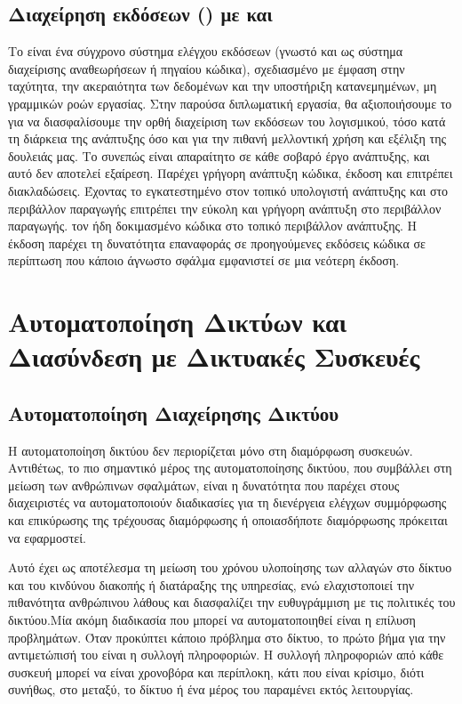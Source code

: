 \subsection{Διαχείρηση εκδόσεων () με  και  }

Το  είναι ένα σύγχρονο σύστημα ελέγχου εκδόσεων (γνωστό και ως σύστημα διαχείρισης αναθεωρήσεων ή πηγαίου κώδικα), 
σχεδιασμένο με έμφαση στην ταχύτητα, την ακεραιότητα των δεδομένων και την υποστήριξη κατανεμημένων, μη γραμμικών ροών εργασίας. 
Στην παρούσα διπλωματική εργασία, θα αξιοποιήσουμε το  για να διασφαλίσουμε την ορθή διαχείριση των εκδόσεων του λογισμικού, 
τόσο κατά τη διάρκεια της ανάπτυξης όσο και για την πιθανή μελλοντική χρήση και εξέλιξη της δουλειάς μας. Το  συνεπώς είναι απαραίτητο σε κάθε σοβαρό 
έργο ανάπτυξης, και αυτό δεν αποτελεί εξαίρεση. Παρέχει γρήγορη ανάπτυξη κώδικα, έκδοση και επιτρέπει διακλαδώσεις. Έχοντας το εγκατεστημένο στον 
τοπικό υπολογιστή ανάπτυξης και στο περιβάλλον παραγωγής επιτρέπει την εύκολη και γρήγορη ανάπτυξη στο περιβάλλον παραγωγής.
τον ήδη δοκιμασμένο κώδικα στο τοπικό περιβάλλον ανάπτυξης. Η έκδοση παρέχει τη δυνατότητα επαναφοράς σε προηγούμενες εκδόσεις κώδικα σε
περίπτωση που κάποιο άγνωστο σφάλμα εμφανιστεί σε μια νεότερη έκδοση. 

\section{Αυτοματοποίηση Δικτύων και Διασύνδεση με Δικτυακές Συσκευές}

\subsection{Αυτοματοποίηση Διαχείρησης Δικτύου}

Η αυτοματοποίηση δικτύου δεν περιορίζεται μόνο στη διαμόρφωση συσκευών. 
Αντιθέτως, το πιο σημαντικό μέρος της αυτοματοποίησης δικτύου, που συμβάλλει στη μείωση των ανθρώπινων σφαλμάτων, 
είναι η δυνατότητα που παρέχει στους διαχειριστές να αυτοματοποιούν διαδικασίες για τη διενέργεια ελέγχων συμμόρφωσης και 
επικύρωσης της τρέχουσας διαμόρφωσης ή οποιασδήποτε διαμόρφωσης πρόκειται να εφαρμοστεί.

Αυτό έχει ως αποτέλεσμα τη μείωση του χρόνου υλοποίησης των αλλαγών στο δίκτυο και του κινδύνου διακοπής ή διατάραξης της υπηρεσίας, 
ενώ ελαχιστοποιεί την πιθανότητα ανθρώπινου λάθους και διασφαλίζει την ευθυγράμμιση με τις πολιτικές του δικτύου.Μία ακόμη διαδικασία που μπορεί να 
αυτοματοποιηθεί είναι η επίλυση προβλημάτων. Όταν προκύπτει κάποιο πρόβλημα στο δίκτυο, το πρώτο βήμα για την αντιμετώπισή του είναι η συλλογή πληροφοριών. 
Η συλλογή πληροφοριών από κάθε συσκευή μπορεί να είναι χρονοβόρα και περίπλοκη, κάτι που είναι κρίσιμο, διότι συνήθως, στο μεταξύ, το δίκτυο ή ένα μέρος του παραμένει 
εκτός λειτουργίας.

